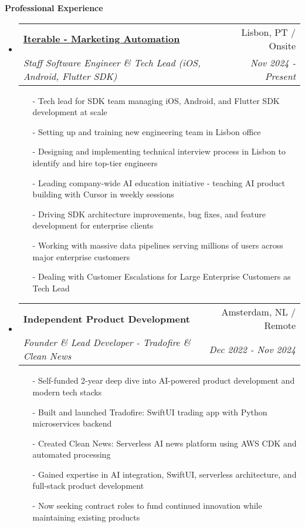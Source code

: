 \documentclass[letterpaper,11pt]{article}
\makeatletter
\newcommand{\resheading}[1]{{\large \colorbox{mygrey}{\begin{minipage}{\textwidth}{\textbf{#1 \vphantom{p\^{E}}}}\end{minipage}}}}
\newcommand{\ressubheading}[4]{
\begin{tabular*}{7.0in}{l@{\extracolsep{\fill}}r}
    \textbf{#1} & #2 \\
    \textit{#3} & \textit{#4} \\
\end{tabular*}\vspace{-6pt}}
\makeatother
\begin{document}
\vspace{0.2in}

\resheading{Professional Experience}
\begin{itemize}

\item
    \ressubheading{\href{https://iterable.com}{Iterable - Marketing Automation}}{Lisbon, PT / Onsite}{Staff Software Engineer \& Tech Lead (iOS, Android, Flutter SDK)}{Nov 2024 - Present}
    \begin{itemize}
        \item[-]{Tech lead for SDK team managing iOS, Android, and Flutter SDK development at scale}
        \item[-]{Setting up and training new engineering team in Lisbon office}
        \item[-]{Designing and implementing technical interview process in Lisbon to identify and hire top-tier engineers}
        \item[-]{Leading company-wide AI education initiative - teaching AI product building with Cursor in weekly sessions}
        \item[-]{Driving SDK architecture improvements, bug fixes, and feature development for enterprise clients}
        \item[-]{Working with massive data pipelines serving millions of users across major enterprise customers}
        \item[-]{Dealing with Customer Escalations for Large Enterprise Customers as Tech Lead}
    \end{itemize}

\item
    \ressubheading{Independent Product Development}{Amsterdam, NL / Remote}{Founder \& Lead Developer - Tradofire \& Clean News}{Dec 2022 - Nov 2024}
    \begin{itemize}
        \item[-]{Self-funded 2-year deep dive into AI-powered product development and modern tech stacks}
        \item[-]{Built and launched Tradofire: SwiftUI trading app with Python microservices backend}
        \item[-]{Created Clean News: Serverless AI news platform using AWS CDK and automated processing}
        \item[-]{Gained expertise in AI integration, SwiftUI, serverless architecture, and full-stack product development}
        \item[-]{Now seeking contract roles to fund continued innovation while maintaining existing products}
    \end{itemize}


\end{itemize}
\end{document}
